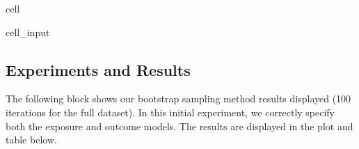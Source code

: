 \documentclass[letterpaper,10pt,english]{jupyterBook}
\begin{document}
\begin{sphinxuseclass}{cell}
\begin{sphinxVerbatimInput}
\begin{sphinxuseclass}{cell_input}
\begin{sphinxVerbatim}[commandchars=\\\{\}]
     
        \PYG{p}{[}\PYG{p}{]}\PYG{p}{[}\PYG{p}{]}     
        \PYG{p}{[}\PYG{p}{]}\PYG{p}{[}\PYG{p}{]}    
       
\end{sphinxVerbatim}

\end{sphinxuseclass}\end{sphinxVerbatimInput}

\end{sphinxuseclass}

\subsection{Experiments and Results}
\label{\detokenize{DR_Methods:experiments-and-results}}
\sphinxAtStartPar
The following  block shows our bootstrap sampling method results displayed (100 iterations for the full dataset). In this initial experiment, we correctly specify both the exposure and outcome models. The results are displayed in the plot and table below.
\end{document}
